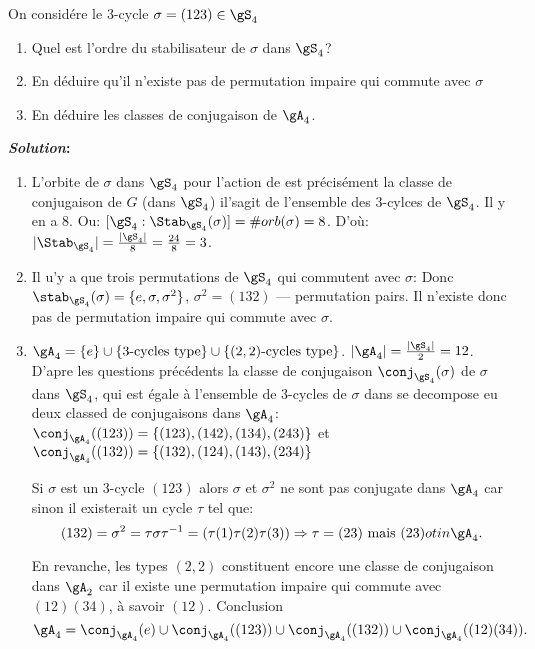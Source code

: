 \begin{exercise}

	On considére le 3-cycle $\sigma=(123)\in\gS_4$
	\begin{enumerate}
		\item Quel est l'ordre du stabilisateur de $\sigma$ dans $\gS_4$?
		\item En déduire qu'il n'existe pas de permutation impaire qui commute avec $\sigma$
		\item En déduire les classes de conjugaison de $\gA_4$.
	\end{enumerate}

	\textbf{\emph{Solution}:}

	\begin{enumerate}

		\item L'orbite de $\sigma$ dans $\gS_4$ pour l'action de est précisément la classe de conjugaison de $G$ (dans $\gS_4$) il'sagit de l'ensemble des 3-cylces de $\gS_4$. Il y en a 8. Ou: $[\gS_4: \Stab_{\gS_4}(\sigma)]=\#orb(\sigma)=8$. D'où: $|\Stab_{\gS_4}|=\frac{|\gS_4|}{8}=\frac{24}{8}=3$.

		\item Il u'y a que trois permutations de $\gS_4$ qui commutent avec $\sigma$: Donc $\stab_{\gS_4}(\sigma)=\{e,\sigma,\sigma^2\}$, $\sigma^2=(132)$ --- permutation pairs. Il n'existe donc pas de permutation impaire qui commute avec $\sigma$.

		\item $\gA_4=\{e\}\cup\{3\text{-cycles type}\}\cup\{(2,2)\text{-cycles type}\}$. $|\gA_4|=\frac{|\gS_4|}2=12$.
		D'apre les questions précédents la classe de conjugaison $\conj_{\gS_4}(\sigma)$ de $\sigma$ dans $\gS_4$, qui est égale à l'ensemble de 3-cycles de $\sigma$ dans se decompose eu deux classed de conjugaisons dans $\gA_4$:\\ $\conj_{\gA_4}((123))=\{(123), (142), (134), (243)\}$ et\\$\conj_{\gA_4}((132))=\{(132), (124), (143), (234)\}$


		\begin{remark}
			Si $\sigma$ est un 3-cycle $(123)$ alors $\sigma$ et $\sigma^2$ ne sont pas conjugate dans $\gA_4$ car sinon il existerait un cycle $\tau$ tel que:
			$$(132)=\sigma^2=\tau\sigma\tau^{-1}=(\tau(1)\tau(2)\tau(3)) \Rightarrow \tau=(23) \mbox{ mais } (23) otin \gA_4.$$
		\end{remark}


		En revanche, les types $(2,2)$ constituent encore une classe de conjugaison dans $\gA_2$ car il existe une permutation impaire qui commute avec $(12)(34)$, à savoir $(12)$. Conclusion $$\gA_4=\conj_{\gA_4}(e)\cup \conj_{\gA_4}((123))\cup \conj_{\gA_4}((132))\cup \conj_{\gA_4}((12)(34)).$$


\end{enumerate}
\end{exercise}
